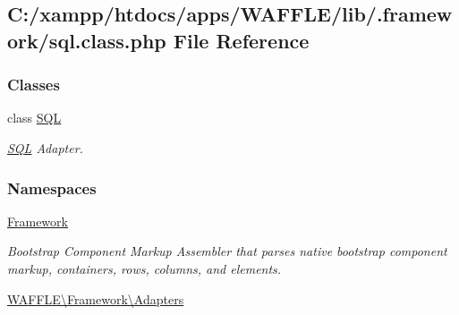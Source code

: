 \hypertarget{sql_8class_8php}{}\subsection{C\+:/xampp/htdocs/apps/\+W\+A\+F\+F\+L\+E/lib/.framework/sql.class.\+php File Reference}
\label{sql_8class_8php}
\subsubsection*{Classes}
\begin{DoxyCompactItemize}
\item 
class \hyperlink{class_w_a_f_f_l_e_1_1_framework_1_1_adapters_1_1_s_q_l}{S\+QL}
\begin{DoxyCompactList}\small\item\em \hyperlink{class_w_a_f_f_l_e_1_1_framework_1_1_adapters_1_1_s_q_l}{S\+QL} Adapter. \end{DoxyCompactList}\end{DoxyCompactItemize}
\subsubsection*{Namespaces}
\begin{DoxyCompactItemize}
\item 
 \hyperlink{namespace_framework}{Framework}
\begin{DoxyCompactList}\small\item\em Bootstrap Component Markup Assembler that parses native bootstrap component markup, containers, rows, columns, and elements. \end{DoxyCompactList}\item 
 \hyperlink{namespace_w_a_f_f_l_e_1_1_framework_1_1_adapters}{W\+A\+F\+F\+L\+E\textbackslash{}\+Framework\textbackslash{}\+Adapters}
\end{DoxyCompactItemize}
